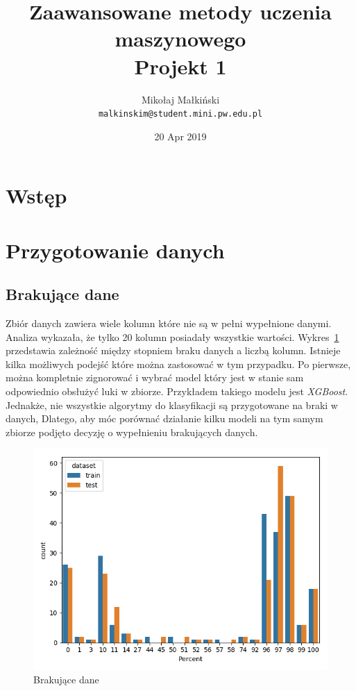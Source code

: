 \documentclass[a4paper,12pt]{article}
\title{
Zaawansowane metody uczenia maszynowego \\
Projekt 1
}
\author{
Mikołaj Małkiński \\
\texttt{malkinskim@student.mini.pw.edu.pl}
}
\date{20 Apr 2019}
\begin{document}
    \maketitle

    \section{Wstęp}

    \section{Przygotowanie danych}

    \subsection{Brakujące dane}
    Zbiór danych zawiera wiele kolumn które nie są w pełni wypełnione danymi.
    Analiza wykazała, że tylko 20 kolumn posiadały wszystkie wartości.
    Wykres~\ref{fig:missing-data} przedstawia zależność między stopniem braku danych a liczbą kolumn.
    Istnieje kilka możliwych podejść które można zastosować w tym przypadku.
    Po pierwsze, można kompletnie zignorować i wybrać model który jest w stanie sam odpowiednio obsłużyć luki w zbiorze.
    Przykładem takiego modelu jest \textit{XGBoost}.
    Jednakże, nie wszystkie algorytmy do klasyfikacji są przygotowane na braki w danych,
    Dlatego, aby móc porównać działanie kilku modeli na tym samym zbiorze podjęto decyzję o wypełnieniu brakujących danych.

    \begin{figure}[!h]
        \centering
        \includegraphics[width=\textwidth]{../doc/images/missing-data.png}
        \caption{Brakujące dane}
        \label{fig:missing-data}
    \end{figure}
\end{document}
